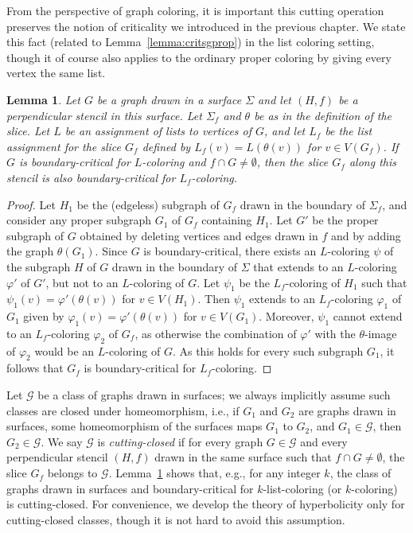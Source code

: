 \documentclass[12pt,twoside,openright,a4paper]{book}
\newtheorem{lemma}[theorem]{Lemma}
\newcommand{\GG}{\mathcal{G}}
\begin{document}
From the perspective of graph coloring, it is important this cutting operation preserves the notion of criticality
we introduced in the previous chapter.  We state this fact (related to Lemma~\ref{lemma:critsgprop}) in the list coloring
setting, though it of course also applies to the ordinary proper coloring by giving every vertex the same list.

\begin{lemma}\label{lemma:cutcrit}
Let $G$ be a graph drawn in a surface $\Sigma$ and let $(H,f)$ be a perpendicular stencil in this surface.
Let $\Sigma_f$ and $\theta$ be as in the definition of the slice.
Let $L$ be an assignment of lists to vertices of $G$, and let $L_f$ be the list assignment for the slice $G_f$
defined by $L_f(v)=L(\theta(v))$ for $v\in V(G_f)$.  If $G$ is boundary-critical for $L$-coloring and $f\cap G\neq\emptyset$, then the slice
$G_f$ along this stencil is also boundary-critical for $L_f$-coloring.
\end{lemma}
\begin{proof}
Let $H_1$ be the (edgeless) subgraph of $G_f$ drawn
in the boundary of $\Sigma_f$, and consider any proper subgraph $G_1$ of $G_f$ containing $H_1$.  Let $G'$ be the proper subgraph
of $G$ obtained by deleting vertices and edges drawn in $f$ and by adding the graph $\theta(G_1)$.  Since $G$ is boundary-critical,
there exists an $L$-coloring $\psi$ of the subgraph $H$ of $G$ drawn in the boundary of $\Sigma$ that extends to an $L$-coloring
$\varphi'$ of $G'$, but not to an $L$-coloring of $G$.  Let $\psi_1$ be the $L_f$-coloring of $H_1$ such that
$\psi_1(v)=\varphi'(\theta(v))$ for $v\in V(H_1)$.  Then $\psi_1$ extends to an $L_f$-coloring $\varphi_1$ of $G_1$
given by $\varphi_1(v)=\varphi'(\theta(v))$ for $v\in V(G_1)$.  Moreover, $\psi_1$ cannot extend to an $L_f$-coloring $\varphi_2$
of $G_f$, as otherwise the combination of $\varphi'$ with the $\theta$-image of $\varphi_2$ would be an $L$-coloring of $G$.
As this holds for every such subgraph $G_1$, it follows that $G_f$ is boundary-critical for $L_f$-coloring.
\end{proof}

Let $\GG$ be a class of graphs drawn in surfaces; we always implicitly assume such classes are closed under homeomorphism,
i.e., if $G_1$ and $G_2$ are graphs drawn in surfaces, some homeomorphism of the surfaces maps $G_1$ to $G_2$, and
$G_1\in\GG$, then $G_2\in\GG$.  We say $\GG$ is \emph{cutting-closed} if for every
graph $G\in\GG$ and every perpendicular stencil $(H,f)$ drawn in the same surface such that $f\cap G\neq\emptyset$, the slice $G_f$ belongs to $\GG$.
Lemma~\ref{lemma:cutcrit} shows that, e.g., for any integer $k$, the class of graphs drawn in surfaces and boundary-critical
for $k$-list-coloring (or $k$-coloring) is cutting-closed.  For convenience, we develop the theory of hyperbolicity
only for cutting-closed classes, though it is not hard to avoid this assumption.
\end{document}
